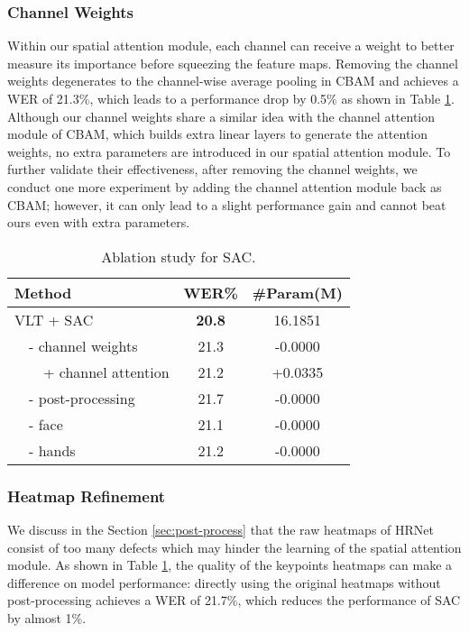 \documentclass[acmsmall,screen]{acmart}
\def \tbf{\textbf}
\begin{document}
\subsubsection{Channel Weights}
Within our spatial attention module, each channel can receive a weight to better measure its importance before squeezing the feature maps.
Removing the channel weights degenerates to the channel-wise average pooling in CBAM \cite{woo2018cbam} and achieves a WER of 21.3\%, which leads to a performance drop by 0.5\% as shown in Table \ref{tab:sac}.
Although our channel weights share a similar idea with the channel attention module of CBAM, which builds extra linear layers to generate the attention weights, no extra parameters are introduced in our spatial attention module.
To further validate their effectiveness, after removing the channel weights, we conduct one more experiment by adding the channel attention module back as CBAM; however, it can only lead to a slight performance gain and cannot beat ours even with extra parameters.

\begin{table}[t]
  \centering
  \caption{Ablation study for SAC.}
  \begin{tabular}{l|cc}
    \toprule
    Method & WER\% & \#Param(M)\\
    \midrule
    VLT + SAC & \tbf{20.8} & 16.1851 \\
    \ \ - channel weights & 21.3 & -0.0000 \\
    \ \ \ \ + channel attention  \cite{woo2018cbam} & 21.2 & +0.0335\\
    \ \ - post-processing & 21.7 & -0.0000 \\
    \ \ - face & 21.1 & -0.0000 \\
    \ \ - hands & 21.2 & -0.0000 \\
    \bottomrule
  \end{tabular}
  \label{tab:sac}
\end{table} \subsubsection{Heatmap Refinement}
We discuss in the Section \ref{sec:post-process} that the raw heatmaps of HRNet \cite{sun2019deep} consist of too many defects which may hinder the learning of the spatial attention module.
As shown in Table \ref{tab:sac}, the quality of the keypoints heatmaps can make a difference on model performance: directly using the original heatmaps without post-processing achieves a WER of 21.7\%, which reduces the performance of SAC by almost 1\%.
\end{document}
